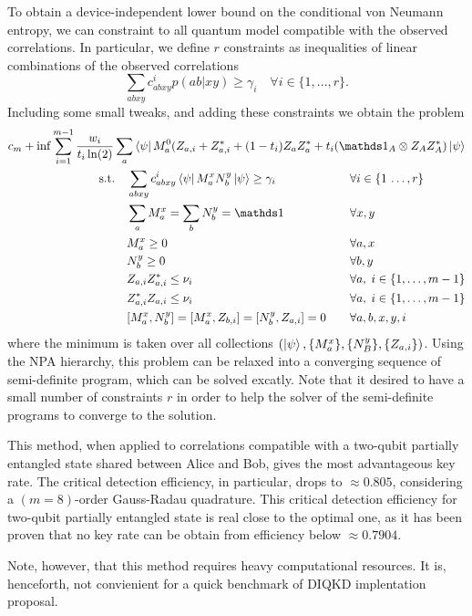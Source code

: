 To obtain a device-independent lower bound on the conditional von Neumann entropy, we can constraint  to  all quantum model compatible with the observed correlations. 
In particular, we define $r$ constraints as inequalities of linear combinations of the observed correlations 
\begin{equation}
	\sum_{abxy}c^i_{abxy}p(ab|xy) \geq \gamma_i \quad \forall i\in\{1,...,r\}.
\end{equation}
Including some small tweaks, and adding these constraints we obtain the problem 
\begin{equation}
	\begin{aligned}
		c_m + \inf \sum_{i=1}^{m-1}\frac{w_i}{t_i\ln(2)}\sum_a 	\bra{\psi} M_a^0(Z_{a,i}+ Z_{a,i}^* +(1-t_i)Z_aZ_a^*+t_i(\id_A\otimes Z_A Z_A^*)\ket{\psi} \\
	\begin{alignedat}{3}
			  &\text{s.t.}\quad && \sum_{abxy} c^i_{abxy}\bra{\psi} M_a^x N_b^y \ket{\psi} \geq \gamma_i  &&\forall i\in\{1\,\dots,r\} \\
			  & && \sum_a M_a^x = \sum_b N_b^y = \id &&\forall x,y\\
			  & && M_a^x \geq 0 && \forall a,x\\
			  & && N_b^y \geq 0 && \forall b,y\\
			  & && Z_{a,i}Z_{a,i}^* \leq \nu_i &&\forall a, \; i\in\{1,\dots,m-1\} \\
			  & && Z_{a,i}^*Z_{a,i} \leq \nu_i &&\forall a, \; i\in\{1,\dots,m-1\} \\
			  & && [M_a^x,N_b^y]=[M_a^x,Z_{b,i}]=[N_b^y,Z_{a,i}] = 0 \qquad&&\forall a,b,x,y,i
	\end{alignedat}
	\end{aligned}
	\label{eq:}
\end{equation}
where the minimum is taken over all collections $(\ket{\psi},\{M_a^x\},\{N_B^y\},\{Z_{a,i}\})$.
Using the NPA hierarchy, this problem can be relaxed into a converging sequence of semi-definite program, which can be solved excatly.
Note that it desired to have a small number of constraints $r$ in order to help the solver of the semi-definite programs to converge to the solution.

\medbreak

This method, when applied to correlations compatible with a two-qubit partially entangled state shared between Alice and Bob, gives the most advantageous key rate. 
The critical detection efficiency, in particular, drops to $\approx 0.805$, considering a $(m=8)$-order Gauss-Radau quadrature.
This critical detection efficiency for two-qubit partially entangled state is real close to the optimal one, as it has been proven that no key rate can be obtain from efficiency below $\approx 0.7904$\cite{Lukanowski2022}.

Note, however, that this method requires heavy computational resources.
It is, henceforth, not convienient for a quick benchmark of DIQKD implentation proposal.

